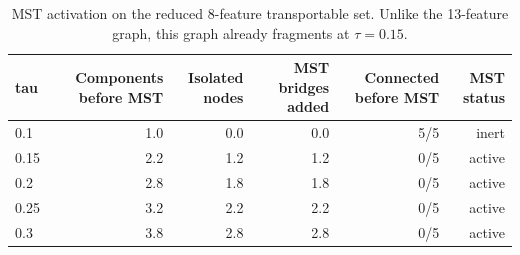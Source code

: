 \begin{table}[t]
\centering
\caption{MST activation on the reduced 8-feature transportable set. Unlike the 13-feature graph, this graph already fragments at $\tau=0.15$.}
\label{tab:mstactext}
\footnotesize
\begin{tabular}{lrrrrr}
\toprule
tau & Components before MST & Isolated nodes & MST bridges added & Connected before MST & MST status \\
\midrule
0.1 & 1.0 & 0.0 & 0.0 & 5/5 & inert \\
0.15 & 2.2 & 1.2 & 1.2 & 0/5 & active \\
0.2 & 2.8 & 1.8 & 1.8 & 0/5 & active \\
0.25 & 3.2 & 2.2 & 2.2 & 0/5 & active \\
0.3 & 3.8 & 2.8 & 2.8 & 0/5 & active \\
\bottomrule
\end{tabular}
\end{table}
